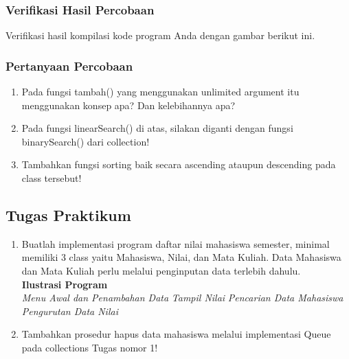 \documentclass[12pt,titlepage]{article}
\begin{document}
\subsubsection{Verifikasi Hasil Percobaan}
Verifikasi hasil kompilasi kode program Anda dengan gambar berikut ini.

\subsubsection{Pertanyaan Percobaan}
\begin{enumerate}
    \item Pada fungsi tambah() yang menggunakan unlimited argument itu menggunakan konsep apa? Dan kelebihannya apa?
    \item Pada fungsi linearSearch() di atas, silakan diganti dengan fungsi binarySearch() dari collection!
    \item Tambahkan fungsi sorting baik secara ascending ataupun descending pada class tersebut!
\end{enumerate}

\subsection{Tugas Praktikum}
\begin{enumerate}
    \item Buatlah implementasi program daftar nilai mahasiswa semester, minimal memiliki 3 class yaitu Mahasiswa, Nilai, dan Mata Kuliah. Data Mahasiswa dan Mata Kuliah perlu melalui penginputan data terlebih dahulu.
    \mbox{}\\ \textbf{Ilustrasi Program} \mbox{}\\ 
    \textit{Menu Awal dan Penambahan Data}
    \textit{Tampil Nilai}
    \textit{Pencarian Data Mahasiswa}
    \textit{Pengurutan Data Nilai}
    \item Tambahkan prosedur hapus data mahasiswa melalui implementasi Queue pada collections Tugas nomor 1!
\end{enumerate}
\end{document}
